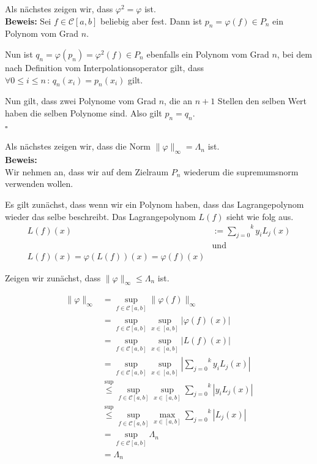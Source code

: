 \documentclass[11pt,a4paper,ngerman]{article}
\begin{document}
Als nächstes zeigen wir, dass $\varphi^2 = \varphi$ ist.\\

\textbf{Beweis:}
Sei $f \in \mathcal{C}[a,b]$ beliebig aber fest.
Dann ist $p_n = \varphi(f) \in P_n$ ein Polynom vom Grad $n$.

Nun ist $q_n = \varphi(p_n) = \varphi^2(f) \in P_n$ ebenfalls ein Polynom vom Grad $n$,
bei dem nach Definition vom Interpolationsoperator gilt, dass
$\forall 0 \leq i \leq n \, : \, q_n(x_i) = p_n(x_i)$ gilt.

Nun gilt, dass zwei Polynome vom Grad $n$, die an $n+1$ Stellen den selben Wert haben die selben Polynome
sind. Also gilt $p_n = q_n$.\\
\mbox{}\hfill$\square$

Als nächstes zeigen wir, dass die Norm $\| \varphi \|_\infty = \Lambda_n$ ist.\\

\textbf{Beweis:}\\

Wir nehmen an, dass wir auf dem Zielraum $P_n$ wiederum die supremumsnorm verwenden wollen.

Es gilt zunächst, dass wenn wir ein Polynom haben, dass das Lagrangepolynom wieder das selbe beschreibt.
Das Lagrangepolynom $L(f)$ sieht wie folg aus.
\begin{equation}\begin{split}
    L(f)(x) &:= \overset{k}{\underset{j=0}{\sum}} y_i L_j(x)\\
        &\text{und}\\
    L(f)(x) = \varphi(L(f))(x) = \varphi(f)(x)
\end{split}\end{equation}

Zeigen wir zunächst, dass $\|\varphi\|_\infty \leq \Lambda_n$ ist.

\begin{equation*}\begin{split}
    \| \varphi \|_\infty  &= \underset{f \in \mathcal{C}[a,b]}{\sup} \| \varphi(f) \|_\infty \\
    &= \underset{f \in \mathcal{C}[a,b]}{\sup} \underset{x \in [a,b]}{\sup} |\varphi(f)(x)|\\
    &= \underset{f \in \mathcal{C}[a,b]}{\sup} \underset{x \in [a,b]}{\sup} |L(f)(x)|\\
    &= \underset{f \in \mathcal{C}[a,b]}{\sup} \underset{x \in [a,b]}{\sup} |\overset{k}{\underset{j=0}{\sum}} y_i L_j(x)|\\
    &\stackrel{\sup}{\leq} \underset{f \in \mathcal{C}[a,b]}{\sup} \underset{x \in [a,b]}{\sup} \overset{k}{\underset{j=0}{\sum}} |y_i L_j(x)|\\
    &\stackrel{\sup}{\leq} \underset{f \in \mathcal{C}[a,b]}{\sup} \underset{x \in [a,b]}{\max} \overset{k}{\underset{j=0}{\sum}} |L_j(x)|\\
    &= \underset{f \in \mathcal{C}[a,b]}{\sup} \Lambda_n\\
    &= \Lambda_n
\end{split}\end{equation*}
\end{document}
